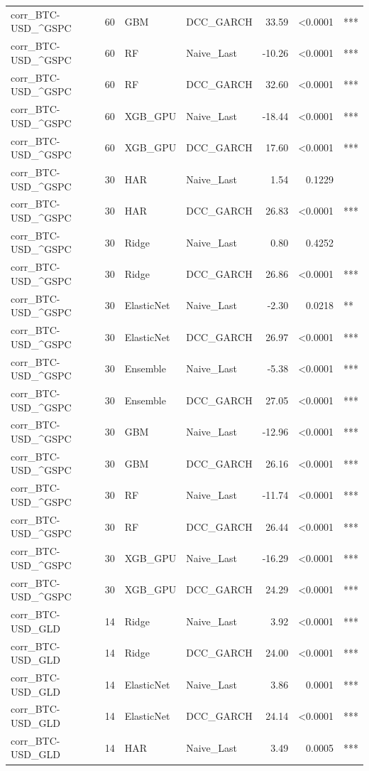 \begin{table}[H]
\begin{tabular}{llllrrl}
corr_BTC-USD_^GSPC & 60 & GBM & DCC_GARCH & 33.59 & <0.0001 & *** \\
corr_BTC-USD_^GSPC & 60 & RF & Naive_Last & -10.26 & <0.0001 & *** \\
corr_BTC-USD_^GSPC & 60 & RF & DCC_GARCH & 32.60 & <0.0001 & *** \\
corr_BTC-USD_^GSPC & 60 & XGB_GPU & Naive_Last & -18.44 & <0.0001 & *** \\
corr_BTC-USD_^GSPC & 60 & XGB_GPU & DCC_GARCH & 17.60 & <0.0001 & *** \\
corr_BTC-USD_^GSPC & 30 & HAR & Naive_Last & 1.54 & 0.1229 &  \\
corr_BTC-USD_^GSPC & 30 & HAR & DCC_GARCH & 26.83 & <0.0001 & *** \\
corr_BTC-USD_^GSPC & 30 & Ridge & Naive_Last & 0.80 & 0.4252 &  \\
corr_BTC-USD_^GSPC & 30 & Ridge & DCC_GARCH & 26.86 & <0.0001 & *** \\
corr_BTC-USD_^GSPC & 30 & ElasticNet & Naive_Last & -2.30 & 0.0218 & ** \\
corr_BTC-USD_^GSPC & 30 & ElasticNet & DCC_GARCH & 26.97 & <0.0001 & *** \\
corr_BTC-USD_^GSPC & 30 & Ensemble & Naive_Last & -5.38 & <0.0001 & *** \\
corr_BTC-USD_^GSPC & 30 & Ensemble & DCC_GARCH & 27.05 & <0.0001 & *** \\
corr_BTC-USD_^GSPC & 30 & GBM & Naive_Last & -12.96 & <0.0001 & *** \\
corr_BTC-USD_^GSPC & 30 & GBM & DCC_GARCH & 26.16 & <0.0001 & *** \\
corr_BTC-USD_^GSPC & 30 & RF & Naive_Last & -11.74 & <0.0001 & *** \\
corr_BTC-USD_^GSPC & 30 & RF & DCC_GARCH & 26.44 & <0.0001 & *** \\
corr_BTC-USD_^GSPC & 30 & XGB_GPU & Naive_Last & -16.29 & <0.0001 & *** \\
corr_BTC-USD_^GSPC & 30 & XGB_GPU & DCC_GARCH & 24.29 & <0.0001 & *** \\
corr_BTC-USD_GLD & 14 & Ridge & Naive_Last & 3.92 & <0.0001 & *** \\
corr_BTC-USD_GLD & 14 & Ridge & DCC_GARCH & 24.00 & <0.0001 & *** \\
corr_BTC-USD_GLD & 14 & ElasticNet & Naive_Last & 3.86 & 0.0001 & *** \\
corr_BTC-USD_GLD & 14 & ElasticNet & DCC_GARCH & 24.14 & <0.0001 & *** \\
corr_BTC-USD_GLD & 14 & HAR & Naive_Last & 3.49 & 0.0005 & *** \\

\end{tabular}
\end{table}
